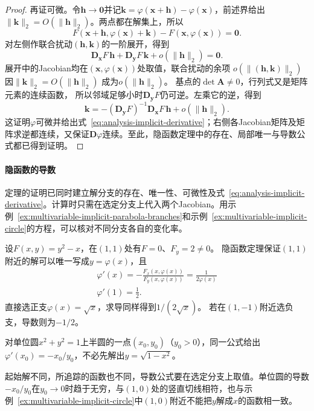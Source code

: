 \begin{proof}
再证可微。令$\bm{h}\to\bm{0}$并记$\bm{k}=\varphi(\bm{x}+\bm{h})-\varphi(\bm{x})$，前述界给出$\lVert\bm{k}\rVert_2=O(\lVert\bm{h}\rVert_2)$。两点都在解集上，所以
\[
 F(\bm{x}+\bm{h},\varphi(\bm{x})+\bm{k})-F(\bm{x},\varphi(\bm{x}))=\bm{0}.
\]
对左侧作联合扰动$(\bm h,\bm k)$的一阶展开，得到
\[
 \bm{D}_{\bm{x}}F\,\bm{h}+\bm{D}_{\bm{y}}F\,\bm{k}+o(\lVert\bm{h}\rVert_2)=\bm{0}.
\]
展开中的Jacobian均在$(\bm x,\varphi(\bm x))$处取值，联合扰动的余项
$o(\lVert(\bm h,\bm k)\rVert_2)$因$\lVert\bm k\rVert_2=O(\lVert\bm h\rVert_2)$
成为$o(\lVert\bm h\rVert_2)$。
基点的$\det\bm A\neq0$，行列式又是矩阵元素的连续函数，
所以邻域足够小时$\bm D_{\bm y}F$仍可逆。左乘它的逆，得到
\[
 \bm{k}=-(\bm{D}_{\bm{y}}F)^{-1}\bm{D}_{\bm{x}}F\,\bm{h}+o(\lVert\bm{h}\rVert_2).
\]
这证明$\varphi$可微并给出式~\eqref{eq:analysis-implicit-derivative}；右侧各Jacobian矩阵及矩阵求逆都连续，又保证$\bm{D}\varphi$连续。至此，隐函数定理中的存在、局部唯一与导数公式都已得到证明。
\end{proof}

\paragraph{隐函数的导数}

定理的证明已同时建立解分支的存在、唯一性、可微性及式~\eqref{eq:analysis-implicit-derivative}。计算时只需在选定分支上代入两个Jacobian。用示例~\ref{ex:multivariable-implicit-parabola-branches}和示例~\ref{ex:multivariable-implicit-circle}的方程，可以核对不同分支各自的变化率。

\begin{example}[隐函数分支的导数]
设$F(x,y)=y^2-x$，在$(1,1)$处有$F=0$、$F_y=2\neq0$。
隐函数定理保证$(1,1)$附近的解可以唯一写成$y=\varphi(x)$，且
\[
 \begin{gathered}
\varphi'(x)=-\frac{F_x(x,\varphi(x))}{F_y(x,\varphi(x))}
 =\frac1{2\varphi(x)}\\
\varphi'(1)=\frac12.
 \end{gathered}
\]
直接选正支$\varphi(x)=\sqrt x$，求导同样得到$1/(2\sqrt x)$。
若在$(1,-1)$附近选负支，导数则为$-1/2$。

对单位圆$x^2+y^2=1$上半圆的一点$(x_0,y_0)$（$y_0>0$），同一公式给出$\varphi'(x_0)=-x_0/y_0$，不必先解出$y=\sqrt{1-x^2}$。
\end{example}

起始解不同，所追踪的函数也不同，导数公式要在选定分支上取值。单位圆的导数$-x_0/y_0$在$y_0\to0$时趋于无穷，与$(1,0)$处的竖直切线相符，也与示例~\ref{ex:multivariable-implicit-circle}中$(1,0)$附近不能把$y$解成$x$的函数相一致。

